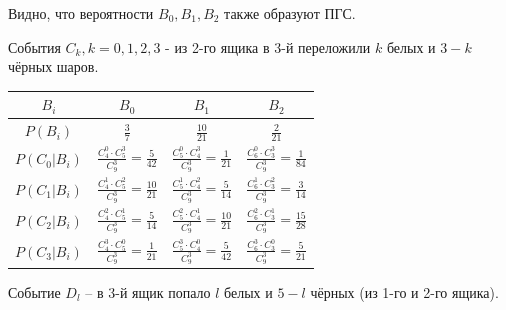 \begin{enumerate}
	Видно, что вероятности $B_0, B_1, B_2$ также образуют ПГС.
	
	События $C_k, k=0,1,2,3$ - из 2-го ящика в 3-й переложили $k$ белых и $3-k$ чёрных шаров.
	
	\begin{table}[h]
		\centering\makegapedcells
		\begin{tabular}{|c|c|c|c|}
			\hline
			$B_i$        & $B_0$                                             & $B_1$                                             & $B_2$                                             \\ \hline
			$P(B_i)$     & $\frac{3}{7}$                                     & $\frac{10}{21}$                                   & $\frac{2}{21}$                                    \\ \hline
			$P(C_0|B_i)$ & $\frac{C_4^0 \cdot C_5^3}{C_9^3} = \frac{5}{42}$  & $\frac{C_5^0 \cdot C_4^3}{C_9^3} = \frac{1}{21}$  & $\frac{C_6^0 \cdot C_3^3}{C_9^3} = \frac{1}{84}$  \\ \hline
			$P(C_1|B_i)$ & $\frac{C_4^1 \cdot C_5^2}{C_9^3} = \frac{10}{21}$ & $\frac{C_5^1 \cdot C_4^2}{C_9^3} = \frac{5}{14}$  & $\frac{C_6^1 \cdot C_3^2}{C_9^3} = \frac{3}{14}$  \\ \hline
			$P(C_2|B_i)$ & $\frac{C_4^2 \cdot C_5^1}{C_9^3} = \frac{5}{14}$  & $\frac{C_5^2 \cdot C_4^1}{C_9^3} = \frac{10}{21}$ & $\frac{C_6^2 \cdot C_3^1}{C_9^3} = \frac{15}{28}$ \\ \hline
			$P(C_3|B_i)$ & $\frac{C_4^3 \cdot C_5^0}{C_9^3} = \frac{1}{21}$  & $\frac{C_5^3 \cdot C_4^0}{C_9^3} = \frac{5}{42}$  & $\frac{C_6^3 \cdot C_3^0}{C_9^3} = \frac{5}{21}$  \\ \hline
		\end{tabular}
	\end{table}
	
	Событие $D_l$ – в 3-й ящик попало $l$ белых и $5-l$ чёрных (из 1-го и 2-го ящика).
	

\end{enumerate}
